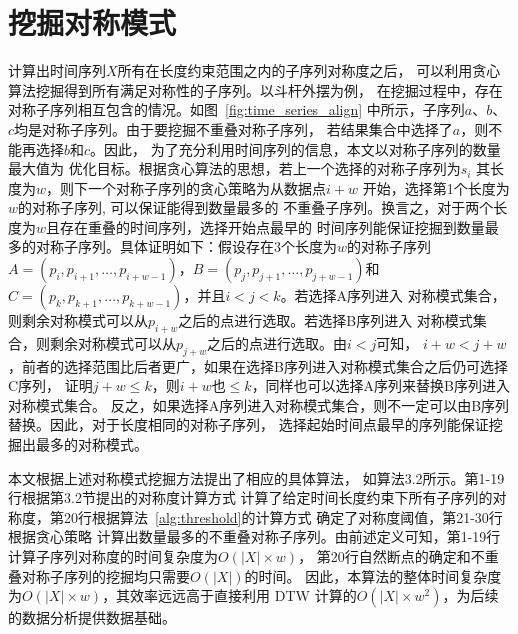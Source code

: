 \section{挖掘对称模式}
计算出时间序列$X$所有在长度约束范围之内的子序列对称度之后，
可以利用贪心算法挖掘得到所有满足对称性的子序列。以斗杆外摆为例，
在挖掘过程中，存在对称子序列相互包含的情况。如图~\ref{fig:time_series_align}
中所示，子序列$a$、$b$、$c$均是对称子序列。由于要挖掘不重叠对称子序列，
若结果集合中选择了$a$，则不能再选择$b$和$c$。因此，
为了充分利用时间序列的信息，本文以对称子序列的数量最大值为
优化目标。根据贪心算法的思想，若上一个选择的对称子序列为$s_i$
其长度为$w$，则下一个对称子序列的贪心策略为从数据点$i+w$
开始，选择第1个长度为$w$的对称子序列, 可以保证能得到数量最多的
不重叠子序列。换言之，对于两个长度为$w$且存在重叠的时间序列，选择开始点最早的
时间序列能保证挖掘到数量最多的对称子序列。具体证明如下：假设存在3个长度为$w$的对称子序列
$A=\left(p_{i}, p_{i+1}, \dots, p_{i+w-1}\right)$，$B=\left(p_{j}, p_{j+1}, \dots, p_{j+w-1}\right)$和
$C=\left(p_{k}, p_{k+1}, \dots, p_{k+w-1}\right)$，并且$i<j<k$。若选择A序列进入
对称模式集合，则剩余对称模式可以从$p_{i+w}$之后的点进行选取。若选择B序列进入
对称模式集合，则剩余对称模式可以从$p_{j+w}$之后的点进行选取。由$i<j$可知，
$i+w<j+w$，前者的选择范围比后者更广，如果在选择B序列进入对称模式集合之后仍可选择C序列，
证明$j+w \leq k$，则$i+w$也$\leq k$，同样也可以选择A序列来替换B序列进入对称模式集合。
反之，如果选择A序列进入对称模式集合，则不一定可以由B序列替换。因此，对于长度相同的对称子序列，
选择起始时间点最早的序列能保证挖掘出最多的对称模式。

本文根据上述对称模式挖掘方法提出了相应的具体算法，
如算法3.2所示。第1-19行根据第3.2节提出的对称度计算方式
计算了给定时间长度约束下所有子序列的对称度，第20行根据算法~\ref{alg:threshold}的计算方式
确定了对称度阈值，第21-30行根据贪心策略
计算出数量最多的不重叠对称子序列。由前述定义可知，第1-19行计算子序列对称度的时间复杂度为$O(|X| \times w)$，
第20行自然断点的确定和不重叠对称子序列的挖掘均只需要$O(|X|)$的时间。
因此，本算法的整体时间复杂度为$O(|X| \times w)$，其效率远远高于直接利用
DTW 计算的$O\left(|X| \times w^{2}\right)$，为后续的数据分析提供数据基础。
\renewcommand{\algorithmicrequire}{\textbf{输入：}\unskip}
\renewcommand{\algorithmicensure}{\textbf{输出：}\unskip}

